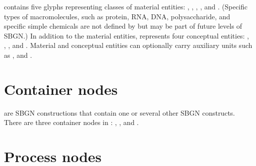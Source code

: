 \SBGNPDLone{} contains five glyphs representing classes of material entities: , , , , and .  (Specific types of macromolecules, such as protein, RNA, DNA, polysaccharide, and specific simple chemicals are not defined by \SBGNPDLone but may be part of future levels of SBGN.)  In addition to the material entities, \SBGNPDLone{} represents four conceptual entities: , , , and .  Material and conceptual entities can optionally carry auxiliary units such as ,  and .

%
%
%
%
%
%
%
%
%
%
%
%
%
%
%
%



\section{Container nodes}\label{sec:CNs}

 are SBGN constructions that contain one or several other SBGN constructs.  There are three container nodes in \SBGNPDLone: , , and .

%
%
%



\section{Process nodes}\label{sec:PNs}

